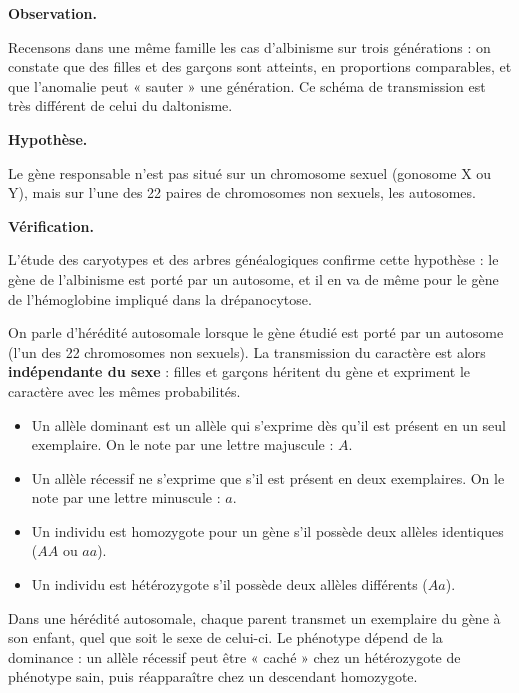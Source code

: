 \documentclass[11pt]{article}
\newcommand{\cle}[1]{{\popxbold\color{popdark}#1}}
\begin{document}
\textbf{Observation.}\par
Recensons dans une même famille les cas d'albinisme sur trois générations : on constate que des filles et des garçons sont atteints, en proportions comparables, et que l'anomalie peut « sauter » une génération. Ce schéma de transmission est très différent de celui du daltonisme.

\textbf{Hypothèse.}\par
Le gène responsable n'est pas situé sur un chromosome sexuel (gonosome X ou Y), mais sur l'une des 22 paires de chromosomes non sexuels, les \cle{autosomes}.

\textbf{Vérification.}\par
L'étude des caryotypes et des arbres généalogiques confirme cette hypothèse : le gène de l'albinisme est porté par un autosome, et il en va de même pour le gène de l'hémoglobine impliqué dans la drépanocytose.

\begin{definition}
On parle d'\cle{hérédité autosomale} lorsque le gène étudié est porté par un \cle{autosome} (l'un des 22 chromosomes non sexuels). La transmission du caractère est alors \textbf{indépendante du sexe} : filles et garçons héritent du gène et expriment le caractère avec les mêmes probabilités.
\begin{itemize}
\item Un \cle{allèle dominant} est un allèle qui s'exprime dès qu'il est présent en un seul exemplaire. On le note par une lettre majuscule : $A$.
\item Un \cle{allèle récessif} ne s'exprime que s'il est présent en deux exemplaires. On le note par une lettre minuscule : $a$.
\item Un individu est \cle{homozygote} pour un gène s'il possède deux allèles identiques ($AA$ ou $aa$).
\item Un individu est \cle{hétérozygote} s'il possède deux allèles différents ($Aa$).
\end{itemize}
\end{definition}

\begin{aretenir}[L'essentiel]
Dans une hérédité autosomale, chaque parent transmet un exemplaire du gène à son enfant, quel que soit le sexe de celui-ci. Le phénotype dépend de la dominance : un allèle récessif peut être « caché » chez un hétérozygote de phénotype sain, puis réapparaître chez un descendant homozygote.
\end{aretenir}
\end{document}
